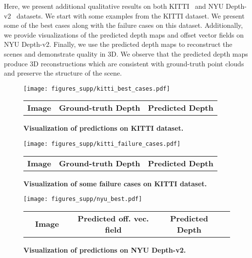 \documentclass[final]{cvpr}
\newcommand{\PAR}[1]{\vskip2pt \noindent{\bf #1}}
\begin{document}
\PAR{Qualitative Results:}
Here, we present additional qualitative results on both KITTI~\cite{kitti} and NYU Depth-v2~\cite{nyu} datasets. We start with some examples from the KITTI dataset. We present some of the best cases along with the failure cases on this dataset. Additionally, we provide visualizations of the predicted depth maps and offset vector fields on NYU Depth-v2. Finally, we use the predicted depth maps to reconstruct the scenes and demonstrate quality in 3D. We observe that the predicted depth maps produce 3D reconstructions which are consistent with ground-truth point clouds and preserve the structure of the scene.

\begin{figure*}
\centering
\begin{minipage}{0.99\textwidth}
   \texttt{[image: figures\_supp/kitti\_best\_cases.pdf]}
    \begin{tabular}{c c c} \hspace{2cm} \textbf{Image} \hspace{3.5cm} & \textbf{Ground-truth Depth} \hspace{2.5cm} & \textbf{Predicted Depth}\\ \end{tabular}
   \caption{\textbf{Visualization of predictions on KITTI dataset.}}
   \label{fig:kitti_best_cases} 
   \vspace{2cm}
\end{minipage}

\begin{minipage}{0.99\textwidth}
   \texttt{[image: figures\_supp/kitti\_failure\_cases.pdf]}
       \begin{tabular}{c l l} \hspace{2cm} \textbf{Image} \hspace{3.5cm} & \textbf{Ground-truth Depth} \hspace{2.5cm} & \textbf{Predicted Depth}\\ \end{tabular}
   \caption{\textbf{Visualization of some failure cases on KITTI dataset.}}
   \label{fig:kitti_failure_cases}
\end{minipage}
\end{figure*}

\begin{figure*}[!t]
\centering
\texttt{[image: figures\_supp/nyu\_best.pdf]}
\begin{tabular}{cccccc} \hspace{1cm}  &  \textbf{Image}  &  \hspace{2cm}  &\hspace{-0.5cm} \textbf{Predicted off. vec. field}  &   \hspace{1cm} \textbf{Predicted Depth} & \\ \end{tabular}
\caption{\textbf{Visualization of predictions on NYU Depth-v2.}}
\label{fig:nyu_best_cases}
\end{figure*}
\end{document}
